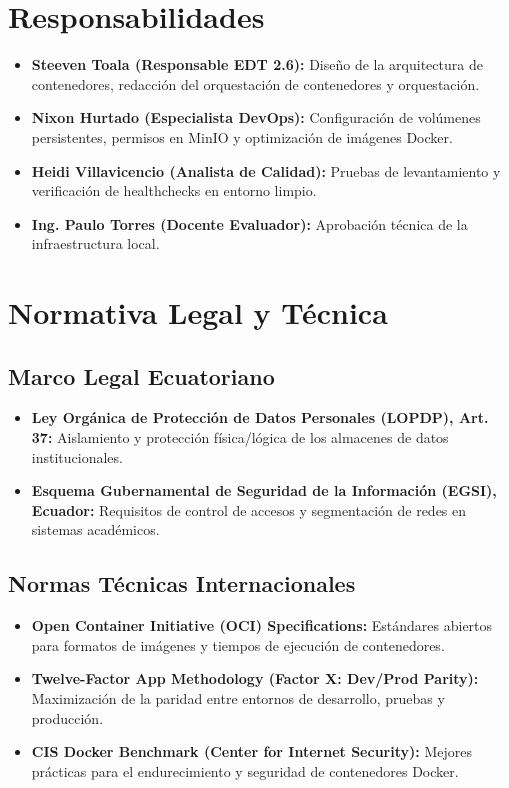 \documentclass[12pt,a4paper]{article}
\begin{document}
\section{Responsabilidades}
\begin{itemize}[leftmargin=1.5em, itemsep=2pt]
    \item \textbf{Steeven Toala (Responsable EDT 2.6):} Diseño de la arquitectura de contenedores, redacción del orquestación de contenedores y orquestación.
    \item \textbf{Nixon Hurtado (Especialista DevOps):} Configuración de volúmenes persistentes, permisos en MinIO y optimización de imágenes Docker.
    \item \textbf{Heidi Villavicencio (Analista de Calidad):} Pruebas de levantamiento y verificación de healthchecks en entorno limpio.
    \item \textbf{Ing. Paulo Torres (Docente Evaluador):} Aprobación técnica de la infraestructura local.
\end{itemize}

\section{Normativa Legal y Técnica}
\subsection{Marco Legal Ecuatoriano}
\begin{itemize}[leftmargin=1.5em, itemsep=2pt]
    \item \textbf{Ley Orgánica de Protección de Datos Personales (LOPDP), Art. 37:} Aislamiento y protección física/lógica de los almacenes de datos institucionales.
    \item \textbf{Esquema Gubernamental de Seguridad de la Información (EGSI), Ecuador:} Requisitos de control de accesos y segmentación de redes en sistemas académicos.
\end{itemize}
\subsection{Normas Técnicas Internacionales}
\begin{itemize}[leftmargin=1.5em, itemsep=2pt]
    \item \textbf{Open Container Initiative (OCI) Specifications:} Estándares abiertos para formatos de imágenes y tiempos de ejecución de contenedores.
    \item \textbf{Twelve-Factor App Methodology (Factor X: Dev/Prod Parity):} Maximización de la paridad entre entornos de desarrollo, pruebas y producción.
    \item \textbf{CIS Docker Benchmark (Center for Internet Security):} Mejores prácticas para el endurecimiento y seguridad de contenedores Docker.
\end{itemize}
\end{document}
